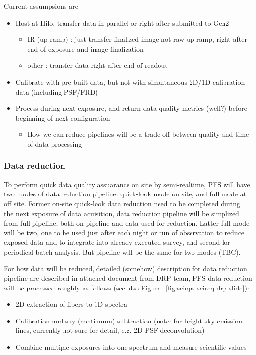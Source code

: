 \documentclass[a4paper,notitlepage]{article}
\begin{document}
Current assumpsions are 
\begin{itemize}
  \item Host at Hilo, transfer data in parallel or right after submitted to Gen2
    \begin{itemize}
      \item IR (up-ramp) : just transfer finalized image not raw up-ramp, right 
         after end of exposure and image finalization 
      \item other : transfer data right after end of readout
    \end{itemize}
  \item Calibrate with pre-built data, but not with simultaneous 2D/1D 
    calibration data (including PSF/FRD)
  \item Process during next exposure, and return data quality metrics (well?) 
    before beginning of next configuration
    \begin{itemize}
      \item How we can reduce pipelines will be a trade off between quality 
        and time of data processing
    \end{itemize}
\end{itemize}


\subsubsection{Data reduction}

To perform quick data quality assuarance on site by semi-realtime, 
PFS will have two modes of data reduction pipeline: quick-look mode on site, 
and full mode at off site. 
Former on-site quick-look data reduction need to be completed during 
the next exposure of data acuisition, data reduction pipeline will be 
simplized from full pipeline, both on pipeline and data used for reduction. 
Latter full mode will be two, one to be used just after each night or run 
of observation to reduce exposed data and to integrate into already executed 
survey, and second for periodical batch analysis. But pipeline will be 
the same for two modes (TBC). 

For how data will be reduced, 
detailed (somehow) description for data reduction pipeline are described 
in attached document from DRP team, PFS data reduction will be processed 
roughly as follows (see also Figure.~\ref{fig:sciops-scireq-drp-slide}): 
\begin{itemize}
  \item 2D extraction of fibers to 1D spectra
  \item Calibration and sky (continuum) subtraction (note: for bright sky 
    emission lines, currently not sure for detail, e.g. 2D PSF deconvolution)
  \item Combine multiple exposures into one spectrum and measure scientific 
    values
\end{itemize}
\end{document}
